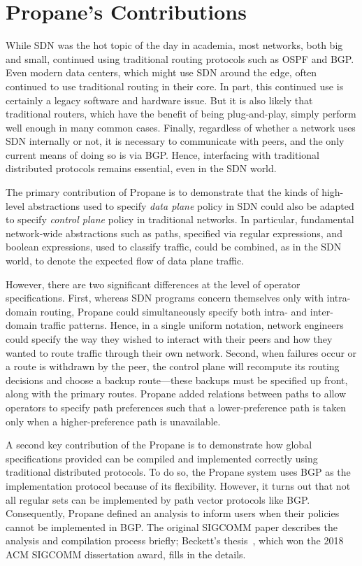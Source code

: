 \documentclass[10pt]{sigalternate052015}
\begin{document}
\section{Propane's Contributions}

While SDN was the hot topic of the day in academia,
most networks, both big and small, continued using
traditional routing protocols such as
OSPF and BGP.  Even modern data centers, which might use SDN around
the edge, often continued to use traditional routing in their
core.  In part, this continued use is certainly
a legacy software and hardware issue.  But it is also likely that
traditional routers, which have the benefit of being plug-and-play,
simply perform well enough in many common
cases.  Finally, regardless of whether a network uses SDN internally
or not, it is necessary to communicate with peers, and the only
current means of doing so is via BGP.  Hence, interfacing with
traditional distributed protocols remains essential, even in the SDN
world.

The primary contribution of Propane is to demonstrate that the kinds
of high-level abstractions used to specify \emph{data plane} policy in SDN could also be adapted to specify
\emph{control plane} policy in traditional networks. In particular,
fundamental network-wide abstractions such as paths, specified via
regular expressions, and boolean expressions, used to
classify traffic, could be combined, as in the SDN world, to denote
the expected flow of data plane traffic.  

However, there are two significant
differences at the level of operator specifications.  First, whereas SDN
programs concern themselves only with intra-domain routing,
Propane could simultaneously specify
both intra- and inter-domain traffic patterns.  Hence, in a single
uniform
notation, network engineers could specify the way they wished to
interact with their peers and how they wanted to route traffic through
their own network.  Second, when failures
occur or a route is withdrawn by the peer, the control plane will recompute its routing decisions and
choose a backup route---these backups must be specified up front,
along with the primary routes.  Propane added relations between paths
to allow operators to specify path preferences such that a lower-preference path is taken only when a higher-preference path is unavailable.

A second key contribution of the Propane is to
demonstrate how global specifications provided can be compiled
and implemented correctly using traditional distributed protocols.  
To do so, the Propane system uses BGP as the
implementation protocol because of its flexibility.  However,
it turns out that not all regular sets can be implemented by path vector protocols
like BGP.  Consequently, Propane defined an analysis to inform users when
their policies cannot be implemented in BGP.  The original
SIGCOMM paper describes the analysis and compilation process briefly;
Beckett's thesis~\cite{beckett:thesis}, which won the 2018 ACM SIGCOMM
dissertation award, fills in the details.
\end{document}
